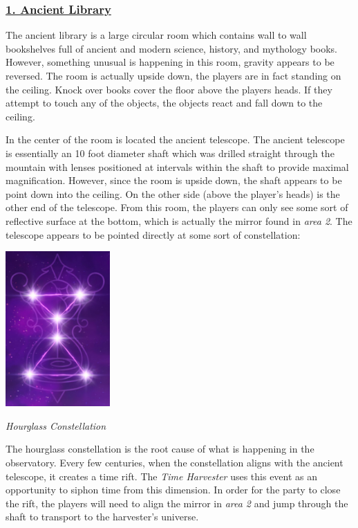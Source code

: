 \documentclass{article}
\begin{document}
\begin{multicols*}{2}
	\subsubsection*{\underline{1. Ancient Library}}
	The ancient library is a large circular room which contains wall to wall bookshelves full of ancient and modern science, history, and mythology books. However, something unusual is happening in this room, gravity appears to be reversed. The room is actually upside down, the players are in fact standing on the ceiling. Knock over books cover the floor above the players heads. If they attempt to touch any of the objects, the objects react and fall down to the ceiling.
	
	In the center of the room is located the ancient telescope. The ancient telescope is essentially an 10 foot diameter shaft which was drilled straight through the mountain with lenses positioned at intervals within the shaft to provide maximal magnification. However, since the room is upside down, the shaft appears to be point down into the ceiling. On the other side (above the player's heads) is the other end of the telescope. From this room, the players can only see some sort of reflective surface at the bottom, which is actually the mirror found in \emph{area 2}. The telescope appears to be pointed directly at some sort of constellation:
	
	\begin{center}
		\includegraphics[width = 0.3\textwidth]{images/constellation}
		
		\emph{Hourglass Constellation}
	\end{center}

	The hourglass constellation is the root cause of what is happening in the observatory. Every few centuries, when the constellation aligns with the ancient telescope, it creates a time rift. The \emph{Time Harvester} uses this event as an opportunity to siphon time from this dimension. In order for the party to close the rift, the players will need to align the mirror in \emph{area 2} and jump through the shaft to transport to the harvester's universe.
	

\end{multicols*}
\end{document}
